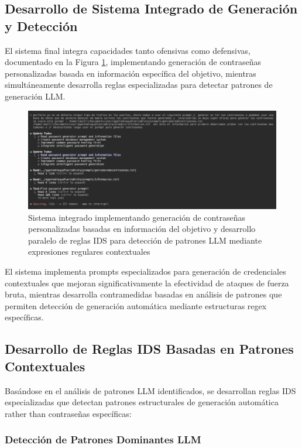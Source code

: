 \subsection{Desarrollo de Sistema Integrado de Generación y Detección}
\FloatBarrier

El sistema final integra capacidades tanto ofensivas como defensivas, documentado en la Figura \ref{fig:integrated_system}, implementando generación de contraseñas personalizadas basada en información específica del objetivo, mientras simultáneamente desarrolla reglas especializadas para detectar patrones de generación LLM.

\begin{figure}[!htbp]
\centering
\includegraphics[width=1\textwidth]{figures/testingcontrasenasgenradasbasadaeninforcionporllms.png}
\caption{Sistema integrado implementando generación de contraseñas personalizadas basadas en información del objetivo y desarrollo paralelo de reglas IDS para detección de patrones LLM mediante expresiones regulares contextuales}
\label{fig:integrated_system}
\end{figure}

El sistema implementa prompts especializados para generación de credenciales contextuales que mejoran significativamente la efectividad de ataques de fuerza bruta, mientras desarrolla contramedidas basadas en análisis de patrones que permiten detección de generación automática mediante estructuras regex específicas.

\subsection{Desarrollo de Reglas IDS Basadas en Patrones Contextuales}

Basándose en el análisis de patrones LLM identificados, se desarrollan reglas IDS especializadas que detectan patrones estructurales de generación automática rather than contraseñas específicas:

\subsubsection{Detección de Patrones Dominantes LLM}


